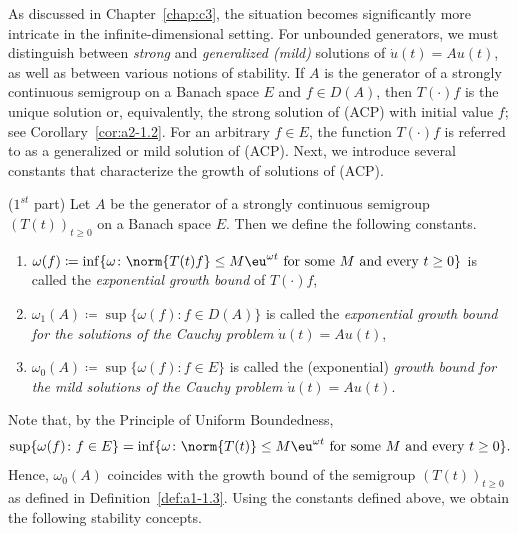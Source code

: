 As discussed in Chapter~\ref{chap:c3}, the situation becomes significantly more intricate in the infinite-dimensional setting. 
For unbounded generators, we must distinguish between \emph{strong} and \emph{generalized (mild)} solutions of\/ $\dot{u}(t) = Au(t)$, as well as between various notions of stability.
If\/ $A$ is the generator of a strongly continuous semigroup on a Banach space $E$ and $f \in D(A)$, then $T(\cdot)f$ is the unique solution or, equivalently, the strong solution of (ACP) with initial value $f$; 
see Corollary~\ref{cor:a2-1.2}.
For an arbitrary $f \in E$, the function $T(\cdot)f$ is referred to as a generalized or mild solution of (ACP). 
Next, we introduce several constants that characterize the growth of solutions of (ACP).
\begin{definition}($1^{st}$ part)\label{def:a4-1.1} 
Let $A$ be the generator of a strongly continuous semigroup $ (T(t))_{t \geq 0} $ on a Banach space $E$. 
Then we define the following constants.
\begin{enumerate}[\upshape (i)]
\item 
$\omega(f) \coloneqq \inf\{\omega \colon \norm{T(t)f} \leq M\eu^{\omega t} \text{ for some } M \text{ and every } t \geq 0\}$ is called the \emph{exponential growth bound} of\/ $T(\cdot)f$,

\item 
$\omega_{1}(A) \coloneqq \sup\{\omega(f) \colon f \in D(A)\}$ is called the \emph{exponential growth bound for the solutions of the Cauchy problem} $\dot{u}(t) = Au(t)$,

\item 
$\omega_{0}(A) \coloneqq \sup\{\omega(f) \colon f \in E\}$ is called the (exponential) \emph{growth bound for the mild solutions of the Cauchy problem} $\dot{u}(t) = Au(t)$.
\end{enumerate}
\end{definition}
Note that, by the Principle of Uniform Boundedness, 
\[
\sup\{\omega(f) \colon f \in E\} 
= \inf \{ \omega \colon \norm{T(t)} \leq M\eu^{\omega t} 
    \text{ for some $M$ and every $t \geq 0 $}\}.
\]
Hence, $\omega_{0}(A)$ coincides with the growth bound of the semigroup $(T(t))_{t \geq 0}$ as defined in Definition~\ref{def:a1-1.3}. 
Using the constants defined above, we obtain the following stability concepts.
\setcounter{theorem}{0}
